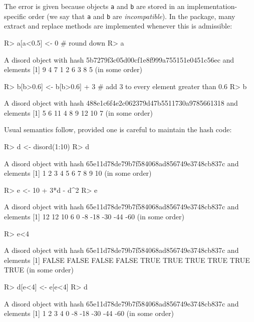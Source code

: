 \documentclass{article}
\begin{document}
The error is given because objects {\tt a} and {\tt b} are stored in
an implementation-specific order (we say that {\tt a} and {\tt b} are
{\em incompatible}).  In the package, many extract and replace methods
are implemented whenever this is admissible:

\begin{Schunk}
\begin{Sinput}
R> a[a<0.5] <- 0  # round down
R> a
\end{Sinput}
\begin{Soutput}
A disord object with hash 5b7279f3c05d00cf1e8f999a755151e0451c56ec and elements
[1] 9 4 7 1 2 6 3 8 5
(in some order)
\end{Soutput}
\begin{Sinput}
R> b[b>0.6] <- b[b>0.6] + 3  # add 3 to every element greater than 0.6
R> b
\end{Sinput}
\begin{Soutput}
A disord object with hash 488e1c6f4e2c062379d47b5511730a9785661318 and elements
[1]  5  6 11  4  8  9 12 10  7
(in some order)
\end{Soutput}
\end{Schunk}

Usual semantics follow, provided one is careful to maintain the hash
code:

\begin{Schunk}
\begin{Sinput}
R> d <- disord(1:10)
R> d
\end{Sinput}
\begin{Soutput}
A disord object with hash 65e11d78de79b7f584068ad856749e3748cb837c and elements
 [1]  1  2  3  4  5  6  7  8  9 10
(in some order)
\end{Soutput}
\begin{Sinput}
R> e <- 10 + 3*d - d^2
R> e
\end{Sinput}
\begin{Soutput}
A disord object with hash 65e11d78de79b7f584068ad856749e3748cb837c and elements
 [1]  12  12  10   6   0  -8 -18 -30 -44 -60
(in some order)
\end{Soutput}
\begin{Sinput}
R> e<4
\end{Sinput}
\begin{Soutput}
A disord object with hash 65e11d78de79b7f584068ad856749e3748cb837c and elements
 [1] FALSE FALSE FALSE FALSE  TRUE  TRUE  TRUE  TRUE  TRUE  TRUE
(in some order)
\end{Soutput}
\begin{Sinput}
R> d[e<4] <- e[e<4]
R> d
\end{Sinput}
\begin{Soutput}
A disord object with hash 65e11d78de79b7f584068ad856749e3748cb837c and elements
 [1]   1   2   3   4   0  -8 -18 -30 -44 -60
(in some order)
\end{Soutput}
\end{Schunk}
\end{document}
